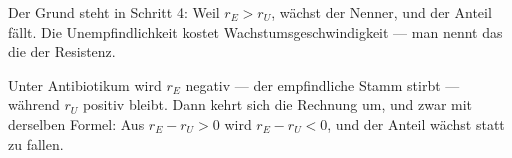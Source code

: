 \begin{aufgabe}
Der Grund steht in Schritt 4: Weil $r_E > r_U$, wächst der Nenner, und der Anteil fällt. Die Unempfindlichkeit kostet Wachstumsgeschwindigkeit --- man nennt das die  der Resistenz.

Unter Antibiotikum wird $r_E$ negativ --- der empfindliche Stamm stirbt --- während $r_U$ positiv bleibt. Dann kehrt sich die Rechnung um, und zwar mit derselben Formel: Aus $r_E - r_U > 0$ wird $r_E - r_U < 0$, und der Anteil wächst statt zu fallen.

\begin{center}
\begin{minipage}{0.86\textwidth}
\end{minipage}
\end{center}
\end{aufgabe}

